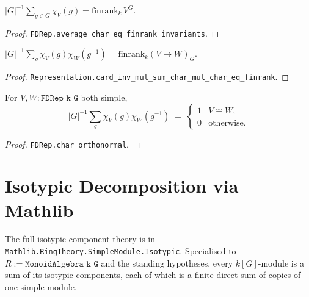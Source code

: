 \begin{theorem}
  \label{thm:avg-char}
  \mathlibok
  \leanok
  $|G|^{-1}\sum_{g \in G}\chi_V(g) = \mathrm{finrank}_k\,V^G$.
\end{theorem}

\begin{proof}\leanok{}
  \texttt{FDRep.average\_char\_eq\_finrank\_invariants}.
\end{proof}

\begin{theorem}
  \label{thm:hom-via-char}
  \mathlibok
  \leanok
  $|G|^{-1}\sum_{g}\chi_V(g)\chi_W(g^{-1}) = \mathrm{finrank}_k(V \to W)_G$.
\end{theorem}

\begin{proof}\leanok{}
  \texttt{Representation.card\_inv\_mul\_sum\_char\_mul\_char\_eq\_finrank}.
\end{proof}

\begin{theorem}
  \label{thm:char-ortho}
  \mathlibok
  \leanok
  For $V, W : \texttt{FDRep k G}$ both simple,
  \[
     |G|^{-1}\sum_g \chi_V(g)\chi_W(g^{-1})
     \;=\; \begin{cases} 1 & V \cong W,\\ 0 & \text{otherwise.}\end{cases}
  \]
\end{theorem}

\begin{proof}\leanok{}
  \texttt{FDRep.char\_orthonormal}.
\end{proof}


\chapter{Isotypic Decomposition via Mathlib}
\label{chap:isotypic}

The full isotypic-component theory is in
\texttt{Mathlib.RingTheory.SimpleModule.Isotypic}.  Specialised to
$R := \texttt{MonoidAlgebra k G}$ and the standing hypotheses, every
$k[G]$-module is a sum of its isotypic components, each of which is a finite
direct sum of copies of one simple module.


